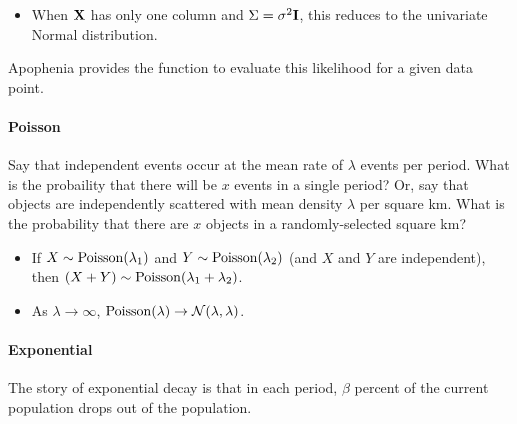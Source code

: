 
\begin{itemize}
\item When ${\bf X}$ has only one column and $\Sigma = \sigma^2{\bf I}$,
this reduces to the univariate Normal distribution.
\end{itemize}

Apophenia provides the function 
to evaluate this likelihood for a given data point.

\paragraph{Poisson}

Say that independent events occur at the mean rate of $\lambda$ events per 
period. What is the probaility that there will be $x$ events in a single 
period? Or, say that  objects are independently scattered
with mean density $\lambda$ per square km. What is the probability that
there are $x$ objects in a randomly-selected square km?

\begin{itemize}
\item If $X \sim {\rm Poisson}(\lambda_1)$ and $Y \sim {\rm
Poisson}(\lambda_2)$ (and $X$ and $Y$ are independent), then $(X + Y) \sim {\rm Poisson}(\lambda_1 +
\lambda_2)$.  \item As $\lambda\to\infty$,  ${\rm Poisson}(\lambda)
\to {\cal N}(\lambda, \lambda)$.  \end{itemize}

\paragraph{Exponential}

The story of exponential decay is that in each period, $\beta$ percent
of the current population drops out of the population.

